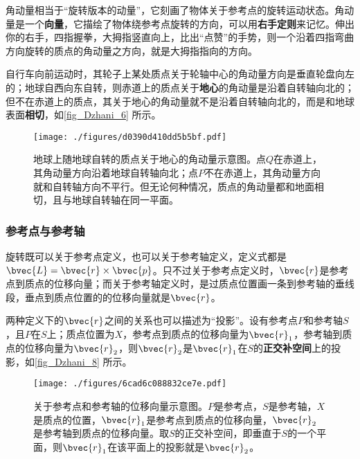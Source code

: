 角动量相当于“旋转版本的动量”，它刻画了物体关于参考点的旋转运动状态。角动量是一个\textbf{向量}，它描绘了物体绕参考点旋转的方向，可以用\textbf{右手定则}来记忆。伸出你的右手，四指握拳，大拇指竖直向上，比出“点赞”的手势，则一个沿着四指弯曲方向旋转的质点的角动量之方向，就是大拇指指向的方向。

自行车向前运动时，其轮子上某处质点关于轮轴中心的角动量方向是垂直轮盘向左的；地球自西向东自转，则赤道上的质点关于\textbf{地心}的角动量是沿着自转轴向北的；但不在赤道上的质点，其关于地心的角动量就不是沿着自转轴向北的，而是和地球表面\textbf{相切}，如\autoref{fig_Dzhani_6} 所示。


\begin{figure}[ht]
\centering
\texttt{[image: ./figures/d0390d410dd5b5bf.pdf]}
\caption{地球上随地球自转的质点关于地心的角动量示意图。点$Q$在赤道上，其角动量方向沿着地球自转轴向北；点$P$不在赤道上，其角动量方向就和自转轴方向不平行。但无论何种情况，质点的角动量都和地面相切，且与地球自转轴在同一平面。} \label{fig_Dzhani_6}
\end{figure}





\subsubsection{参考点与参考轴}



旋转既可以关于参考点定义，也可以关于参考轴定义，定义式都是$\bvec{L}=\bvec{r}\times \bvec{p}$。只不过关于参考点定义时，$\bvec{r}$是参考点到质点的位移向量；而关于参考轴定义时，是过质点位置画一条到参考轴的垂线段，垂点到质点位置的的位移向量就是$\bvec{r}$。


两种定义下的$\bvec{r}$之间的关系也可以描述为“投影”。设有参考点$P$和参考轴$S$，且$P$在$S$上；质点位置为$X$，参考点到质点的位移向量为$\bvec{r}_1$，参考轴到质点的位移向量为$\bvec{r}_2$，则$\bvec{r}_2$是$\bvec{r}_1$在$S$的\textbf{正交补空间}上的投影，如\autoref{fig_Dzhani_8} 所示。



\begin{figure}[ht]
\centering
\texttt{[image: ./figures/6cad6c088832ce7e.pdf]}
\caption{关于参考点和参考轴的位移向量示意图。$P$是参考点，$S$是参考轴，$X$是质点的位置，$\bvec{r}_1$是参考点到质点的位移向量，$\bvec{r}_2$是参考轴到质点的位移向量。取$S$的正交补空间，即垂直于$S$的一个平面，则$\bvec{r}_1$在该平面上的投影就是$\bvec{r}_2$。} \label{fig_Dzhani_8}
\end{figure}



